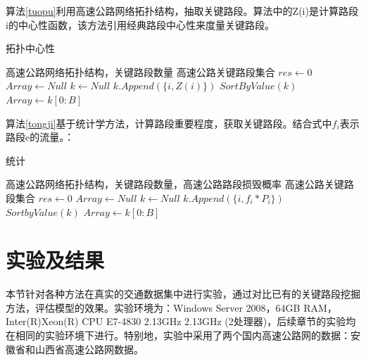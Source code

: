     	算法\ref{tuopu}利用高速公路网络拓扑结构，抽取关键路段。算法中的Z(i)是计算路段i的中心性函数\parencite{Phillip1972Factoring}，该方法引用经典路段中心性来度量关键路段。

    	\begin{algorithm}[!h]
        \caption{拓扑中心性}  
        \label{tuopu}
        \begin{algorithmic}[1] %
            \Require 高速公路网络拓扑结构，关键路段数量
            \Ensure 高速公路关键路段集合
                \State $res\gets 0$  
                \State $Array\gets Null$  
                \State $k\gets Null$ 
                		\State $k.Append(\{i,Z(i)\})$ 
                	\EndFor  
                \State $SortByValue(k)$
                \State $Array\gets k[0:B]$
                \State {}  
            \EndFunction  
        \end{algorithmic}  
    	\end{algorithm} 

    	算法\ref{tongji}基于统计学方法，计算路段重要程度，获取关键路段。结合式中$f_i$表示路段e的流量。：

    	\begin{algorithm}[!h]
        \caption{统计}  
        \label{tongji}
        \begin{algorithmic}[1] %
            \Require 高速公路网络拓扑结构，关键路段数量，高速公路路段损毁概率
            \Ensure 高速公路关键路段集合
                \State $res\gets 0$  
                \State $Array\gets Null$  
                \State $k\gets Null$ 
                	\State $k.Append( \{i,f_i*P_i\})$
                \EndFor  
                \State $SortbyValue(k)$
                \State $Array\gets k[0:B]$
                \State {}  
            \EndFunction  
        \end{algorithmic}  
    	\end{algorithm} 


		\section{实验及结果}
		本节针对各种方法在真实的交通数据集中进行实验，通过对比已有的关键路段挖掘方法，评估模型的效果。实验环境为：Windows Server 2008，64GB RAM，Inter(R)Xeon(R) CPU E7-4830 2.13GHz 2.13GHz (2处理器)，后续章节的实验均在相同的实验环境下进行。特别地，实验中采用了两个国内高速公路网的数据：安徽省和山西省高速公路网数据。
